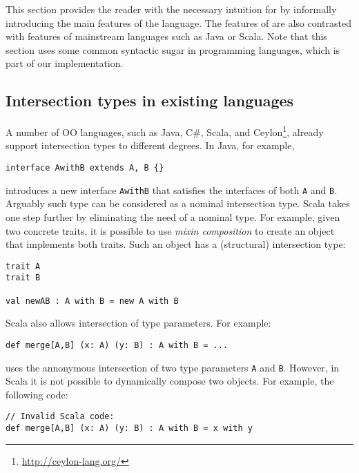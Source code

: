 This section provides the reader with the necessary intuition for
\name by informally introducing the main features of the language.
The features of \name are also contrasted with features of mainstream
languages such as Java or Scala. Note that this section uses some
common syntactic sugar in programming languages, which is
part of our implementation.


\subsection{Intersection types in existing languages}\label{subsec:interScala}

A number of OO languages, such as Java, C\#, Scala, and
Ceylon\footnote{\url{http://ceylon-lang.org/}}, already support intersection
types to different degrees. In Java, for example,

\begin{lstlisting}
interface AwithB extends A, B {}
\end{lstlisting}

\noindent introduces a new interface \lstinline{AwithB} that satisfies the interfaces of
both \lstinline{A} and \lstinline{B}. Arguably such type can be considered as a nominal
intersection type. Scala takes one step further by eliminating the
need of a nominal type. For example, given two concrete traits, it is possible to
use \emph{mixin composition} to create an object that implements both
traits. Such an object has a (structural) intersection type:

\begin{lstlisting}
trait A
trait B

val newAB : A with B = new A with B
\end{lstlisting}

\noindent Scala also allows intersection of type parameters. For example:
\begin{lstlisting}
def merge[A,B] (x: A) (y: B) : A with B = ...
\end{lstlisting}
uses the annonymous intersection of two type parameters \lstinline{A} and
\lstinline{B}. However, in Scala it is not possible to dynamically
compose two objects. For example, the following code:

\begin{lstlisting}
// Invalid Scala code:
def merge[A,B] (x: A) (y: B) : A with B = x with y
\end{lstlisting}

